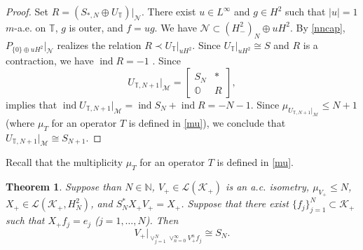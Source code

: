 \documentclass[a4paper,oneside,11pt]{amsart}
\numberwithin{equation}{section}
\theoremstyle{plain}
\newtheorem{theorem}{Theorem}[section]
\theoremstyle{definition}
\begin{document}
\begin{proof}
Set $R= (S_{*,N}\oplus U_{\mathbb T})|_{\mathcal N}$. 
There exist $u\in L^\infty$ and $g\in H^2$ such that $|u|=1$ $m$-a.e. on $\mathbb T$, $g$ is outer, and $f=ug$. 
We have 
$\mathcal N\subset (H^2_-)_N\oplus uH^2$. By \eqref{nncap}, $P_{\{0\}\oplus uH^2}|_{\mathcal N}$ realizes the relation $R\prec U_{\mathbb T}|_{uH^2}$. 
Since $U_{\mathbb T}|_{uH^2}\cong S$ and $R$ is a contraction, we have $\operatorname{ind}R=-1$ \cite{takahashi}.
Since   
\begin{equation*} U_{\mathbb T, N+1}|_{\mathcal M}=\left[\begin{matrix} S_N & *\\ \mathbb O & R \end{matrix}\right], \end{equation*}
 {\cite[Theorem  XI.3.7]{conway}} implies that $\operatorname{ind}U_{\mathbb T, N+1}|_{\mathcal M}=\operatorname{ind}S_N+\operatorname{ind}R=-N-1$. 
Since $\mu_{U_{\mathbb T, N+1}|_{\mathcal M}}\leq N+1$ (where $\mu_T$ for an operator $T$ is defined in \eqref{mu}), we conclude that $U_{\mathbb T, N+1}|_{\mathcal M}\cong S_{N+1}$.
\end{proof}

Recall that the multiplicity  $\mu_T$ for an operator $T$ is defined in \eqref{mu}. 

\begin{theorem} \label {thmmainiso}Suppose than $N\in\mathbb N$, $V_+\in\mathcal L(\mathcal K_+)$ is an a.c. isometry, 
$\mu_{V_+}\leq N$, 
$X_+\in\mathcal L(\mathcal K_+, H^2_N)$, and $S_N^*X_+V_+=X_+$. Suppose that there exist
 $\{f_j\}_{j=1}^N\subset\mathcal K_+$
such that $X_+f_j=e_j$ ($j=1,\ldots, N$). Then \begin{equation*}V_+|_{\vee_{j=1}^N\vee_{n=0}^\infty V_+^n f_j}\cong S_N.\end{equation*}
\end{theorem}
\end{document}
